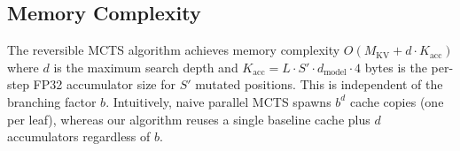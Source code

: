 \subsection{Memory Complexity}

\begin{proposition}
\label{prop:memory}
The reversible MCTS algorithm achieves memory complexity $O(M_{\text{KV}} + d \cdot K_{\text{acc}})$ where $d$ is the maximum search depth and $K_{\text{acc}} = L \cdot S' \cdot d_{\text{model}} \cdot 4$ bytes is the per-step FP32 accumulator size for $S'$ mutated positions. This is independent of the branching factor $b$. Intuitively, naive parallel MCTS spawns $b^d$ cache copies (one per leaf), whereas our algorithm reuses a single baseline cache plus $d$ accumulators regardless of $b$.
\end{proposition}


